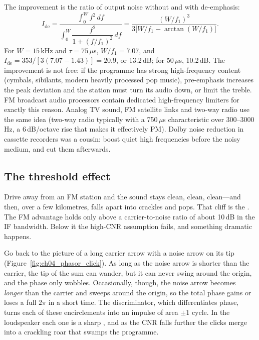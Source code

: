 The improvement is the ratio of output noise without and with de-emphasis:
\begin{equation}
I_{\text{de}}=\frac{\int_0^W f^2\,df}{\int_0^W\dfrac{f^2}{1+(f/f_1)^2}\,df}
=\frac{(W/f_1)^3}{3\big[W/f_1-\arctan(W/f_1)\big]}.
\label{eq:ch04:deemph}
\end{equation}
For $W=15$\,kHz and $\tau=75\,\mu$s, $W/f_1=7.07$, and $I_{\text{de}}=353/[3(7.07-1.43)]=20.9$, or 13.2\,dB;
for 50\,$\mu$s, 10.2\,dB. The improvement is not free: if the programme has strong high-frequency content
(cymbals, sibilants, modern heavily processed pop music), pre-emphasis increases the peak deviation and the
station must turn its audio down, or limit the treble. FM broadcast audio processors contain dedicated
high-frequency limiters for exactly this reason. Analog TV sound, FM satellite links and two-way radio use
the same idea (two-way radio typically with a 750\,$\mu$s characteristic over 300--3000\,Hz, a
$6$\,dB/octave rise that makes it effectively PM). Dolby noise reduction in cassette recorders was a cousin:
boost quiet high frequencies before the noisy medium, and cut them afterwards.

\subsection{The threshold effect}
\label{sec:ch04:threshold}

Drive away from an FM station and the sound stays clean, clean, clean---and then, over a few kilometres,
falls apart into crackles and pops. That cliff is the . The FM advantage holds only
above a carrier-to-noise ratio of about 10\,dB in the IF bandwidth. Below it the high-CNR assumption
fails, and something dramatic happens.


Go back to the picture of a long carrier arrow with a noise arrow on its tip
(Figure~\ref{fig:ch04_phasor_click}). As long as the noise arrow is shorter than the carrier, the tip of the
sum can wander, but it can never swing around the origin, and the phase only wobbles. Occasionally,
though, the noise arrow becomes \emph{longer} than the carrier and sweeps around the origin, so the total
phase gains or loses a full $2\pi$ in a short time. The discriminator, which differentiates phase, turns
each of these encirclements into an impulse of area $\pm1$ cycle. In the loudspeaker each one is a sharp
, and as the CNR falls further the clicks merge into a crackling roar that swamps the
programme.

